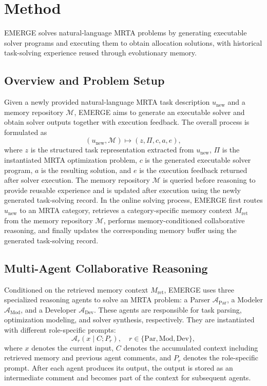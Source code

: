 \documentclass[letterpaper,journal]{IEEEtran}
\begin{document}
\section{Method}

EMERGE solves natural-language MRTA problems by generating executable solver programs and executing them to obtain allocation solutions, with historical task-solving experience reused through evolutionary memory.

\subsection{Overview and Problem Setup}
Given a newly provided natural-language MRTA task description \(u_{\mathrm{new}}\) and a memory repository \(\mathcal{M}\), EMERGE aims to generate an executable solver and obtain solver outputs together with execution feedback. The overall process is formulated as
\begin{equation}
(u_{\mathrm{new}},\mathcal{M}) \mapsto (z,\Pi,c,a,e),
\end{equation}
where \(z\) is the structured task representation extracted from \(u_{\mathrm{new}}\), \(\Pi\) is the instantiated MRTA optimization problem, \(c\) is the generated executable solver program, \(a\) is the resulting solution, and \(e\) is the execution feedback returned after solver execution. 
The memory repository \(\mathcal{M}\) is queried before reasoning to provide reusable experience and is updated after execution using the newly generated task-solving record. In the online solving process, EMERGE first routes \(u_{\mathrm{new}}\) to an MRTA category, retrieves a category-specific memory context \(M_{\mathrm{ret}}\) from the memory repository \(\mathcal{M}\), performs memory-conditioned collaborative reasoning, and finally updates the corresponding memory buffer using the generated task-solving record.






\subsection{Multi-Agent Collaborative Reasoning}


Conditioned on the retrieved memory context \(M_{\mathrm{ret}}\), EMERGE uses three specialized reasoning agents to solve an MRTA problem: a Parser \(\mathcal{A}_{\mathrm{Par}}\), a Modeler \(\mathcal{A}_{\mathrm{Mod}}\), and a Developer \(\mathcal{A}_{\mathrm{Dev}}\). These agents are responsible for task parsing, optimization modeling, and solver synthesis, respectively. They are instantiated with different role-specific prompts:
\[
\mathcal{A}_{r}(x \mid C;P_r),
\quad r\in\{\mathrm{Par},\mathrm{Mod},\mathrm{Dev}\},
\]
where \(x\) denotes the current input, \(C\) denotes the accumulated context including retrieved memory and previous agent comments, and \(P_r\) denotes the role-specific prompt. After each agent produces its output, the output is stored as an intermediate comment and becomes part of the context for subsequent agents. 
\end{document}
